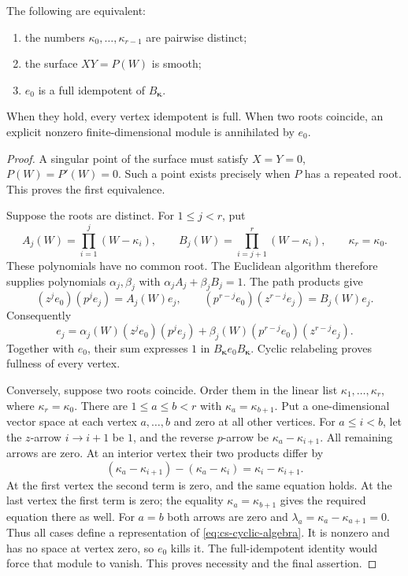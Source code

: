 \begin{theorem}\label{thm:cs-full-iff}
The following are equivalent:
\begin{enumerate}
\item the numbers \(\kappa_0,\ldots,\kappa_{r-1}\) are pairwise distinct;
\item the surface \(XY=P(W)\) is smooth;
\item \(e_0\) is a full idempotent of \(B_{\boldsymbol\kappa}\).
\end{enumerate}
When they hold, every vertex idempotent is full.
When two roots coincide, an explicit nonzero finite-dimensional
module is annihilated by \(e_0\).
\end{theorem}
\begin{proof}
A singular point of the surface must satisfy
\(X=Y=0\), \(P(W)=P'(W)=0\).
Such a point exists precisely when \(P\) has a repeated root.
This proves the first equivalence.

Suppose the roots are distinct. For \(1\leq j<r\), put
\[
 A_j(W)=\prod_{i=1}^j(W-\kappa_i),\qquad
 B_j(W)=\prod_{i=j+1}^r(W-\kappa_i),\qquad \kappa_r=\kappa_0.
\]
These polynomials have no common root. The Euclidean algorithm
therefore supplies polynomials \(\alpha_j,\beta_j\) with
\(\alpha_jA_j+\beta_jB_j=1\).
The path products give
\[
 (z^je_0)(p^je_j)=A_j(W)e_j,\qquad
 (p^{r-j}e_0)(z^{r-j}e_j)=B_j(W)e_j.
\]
Consequently
\begin{equation}\label{eq:cs-bezout}
 e_j=\alpha_j(W)(z^je_0)(p^je_j)
       +\beta_j(W)(p^{r-j}e_0)(z^{r-j}e_j).
\end{equation}
Together with \(e_0\), their sum expresses \(1\) in
\(B_{\boldsymbol\kappa}e_0B_{\boldsymbol\kappa}\).
Cyclic relabeling proves fullness of every vertex.

Conversely, suppose two roots coincide. Order them in the linear
list \(\kappa_1,\ldots,\kappa_r\), where \(\kappa_r=\kappa_0\).
There are \(1\leq a\leq b<r\) with \(\kappa_a=\kappa_{b+1}\).
Put a one-dimensional vector space at each vertex \(a,\ldots,b\)
and zero at all other vertices. For \(a\leq i<b\), let the
\(z\)-arrow \(i\to i+1\) be \(1\), and the reverse \(p\)-arrow
be \(\kappa_a-\kappa_{i+1}\).
All remaining arrows are zero.
At an interior vertex their two products differ by
\[
 (\kappa_a-\kappa_{i+1})-(\kappa_a-\kappa_i)
 =\kappa_i-\kappa_{i+1}.
 \]
At the first vertex the second term is zero, and the same equation
holds. At the last vertex the first term is zero; the equality
\(\kappa_a=\kappa_{b+1}\) gives the required equation there as well.
For \(a=b\) both arrows are zero and
\(\lambda_a=\kappa_a-\kappa_{a+1}=0\).
Thus all cases define a representation of
\eqref{eq:cs-cyclic-algebra}. It is nonzero and has no space at
vertex zero, so \(e_0\) kills it.
The full-idempotent identity would force that module to vanish.
This proves necessity and the final assertion.
\end{proof}

